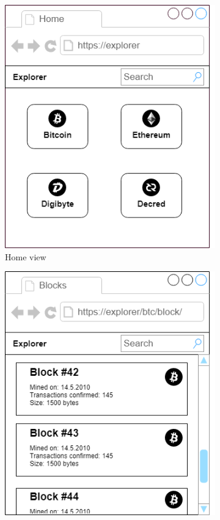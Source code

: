 \begin{figure}[h]
    \begin{subfigure}{.5\textwidth}
        \centering
        \includegraphics[width=1.0\linewidth]{mockups/home.png}
        \caption{Home view}
        \label{homeMockup}
    \end{subfigure}
    \begin{subfigure}{.5\textwidth}
        \centering
        \includegraphics[width=1.0\linewidth]{mockups/blocks.png}

\end{subfigure}
\end{figure}
